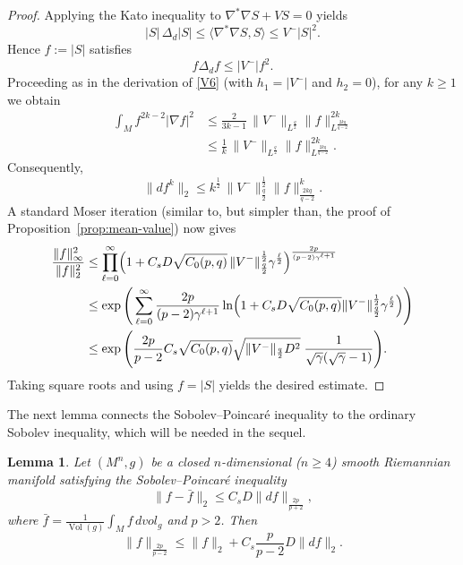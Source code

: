 \documentclass[12pt, twoside]{article}
\newtheorem{lemma}[theorem]{Lemma}
\theoremstyle{definition}
\numberwithin{equation}{section}
\begin{document}
	\begin{proof}
		Applying the Kato inequality to \(\nabla^{*}\nabla S + V S = 0\) yields
		\[
		|S|\,\Delta_{d}|S| \le \langle\nabla^{*}\nabla S,S\rangle \le V^{-}|S|^{2}.
		\]
		Hence \(f := |S|\) satisfies
		\[
		f\Delta_{d}f \le |V^{-}| f^{2}.
		\]
		Proceeding as in the derivation of \eqref{V6} (with \(h_{1}=|V^{-}|\) and \(h_{2}=0\)), for any \(k\ge 1\) we obtain
		\begin{align*}
		\int_M f^{2k-2}|\nabla f|^2 
		&\le \frac{2}{3k-1}\, \|V^{-}\|_{L^{\frac{q}{2}}} \|f\|_{L^{\frac{2kq}{q-2}}}^{2k} \\
		&\le \frac{1}{k}\, \|V^{-}\|_{L^{\frac{q}{2}}} \|f\|_{L^{\frac{2kq}{q-2}}}^{2k}.
		\end{align*}
		Consequently,
		\[
		\|d f^{k}\|_2 \le k^{\frac{1}{2}}\,\|V^{-}\|_{\frac{q}{2}}^{\frac{1}{2}} \|f\|_{\frac{2kq}{q-2}}^{k}.
		\]
		A standard Moser iteration (similar to, but simpler than, the proof of Proposition~\ref{prop:mean-value}) now gives
		\begin{align*}
		\frac{\|f\|_\infty^2}{\|f\|_2^2}
		&\le \prod_{\ell=0}^{\infty} 
		\Bigl(1 + C_s D \sqrt{C_{0}(p,q)}\,\|V^{-}\|_{\frac{q}{2}}^{\frac{1}{2}} \gamma^{\frac{\ell}{2}} \Bigr)^{\frac{2p}{(p-2)\gamma^{\ell+1}}} \\
		&\le \exp\Bigg( \sum_{\ell=0}^{\infty} 
		\frac{2p}{(p-2)\gamma^{\ell+1}}
		\ln\Bigl(1 + C_s D \sqrt{C_{0}(p,q)}\|V^{-}\|_{\frac{q}{2}}^{\frac{1}{2}} \gamma^{\frac{\ell}{2}} \Bigr) \Bigg) \\
		&\le \exp\Bigg( \frac{2p}{p-2}C_s\sqrt{C_{0}(p,q)} \sqrt{\|V^{-}\|_{\frac{q}{2}}D^{2}}\;
		\frac{1}{\sqrt{\gamma}(\sqrt{\gamma}-1)} \Bigg).
		\end{align*}
		Taking square roots and using \(f = |S|\) yields the desired estimate.
	\end{proof}
	The next lemma connects the Sobolev--Poincar\'e inequality to the ordinary Sobolev inequality, which will be needed in the sequel.	
	\begin{lemma}\label{lem:sobolev-poincare-implies-sobolev}
		Let \((M^{n},g)\) be a closed \(n\)-dimensional (\(n\ge4\)) smooth Riemannian manifold satisfying the Sobolev--Poincar\'e inequality
		\[
		\|f-\bar{f}\|_{2}\le C_{s}D\|df\|_{\frac{2p}{p+2}},
		\]
		where \(\bar{f}=\frac{1}{\operatorname{Vol}(g)}\int_{M}f\,dvol_{g}\) and $p>2$. Then
		\[
		\|f\|_{\frac{2p}{p-2}}
		\le\|f\|_{2}+C_{s}\frac{p}{p-2}D\|df\|_{2}.
		\]
	\end{lemma}
	
\end{document}
